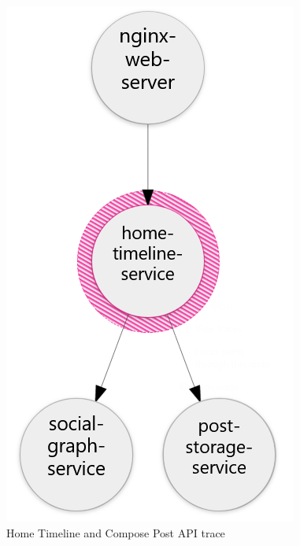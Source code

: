 \begin{figure}[htb]
    \centering
    \caption{Home Timeline and Compose Post API trace}
    \label{fig:ht-cp-trace}
    \begin{minipage}{0.25\linewidth}
        \includegraphics[width=1.0\linewidth]{Figures/Home-Timeline-GET-Trace.png}
    \end{minipage}\hfill
    \begin{minipage}{0.75\linewidth}

\end{minipage}
\end{figure}
